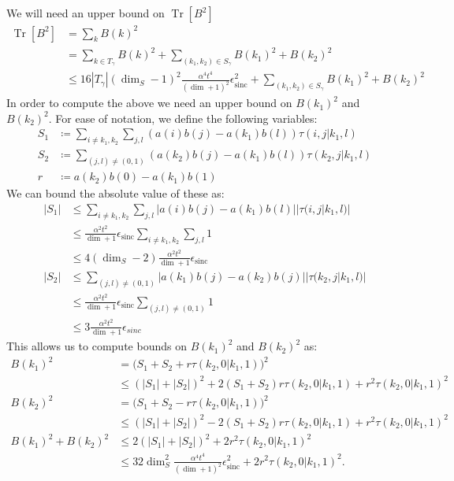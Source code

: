 \documentclass{article}
\newcommand{\brackets}[1]{\left[ #1 \right]}
\newcommand{\abs}[1]{\left| #1 \right|}
\DeclareMathOperator{\Tr}{Tr}
\newcommand{\trace}[1]{\Tr \brackets{ #1 }}
\DeclareMathOperator{\sinc}{sinc}
\begin{document}
We will need an upper bound on $\trace{B^2}$
\begin{align}
    \trace{B^2} &= \sum_k B(k)^2 \\
    &= \sum_{k \in T_{\gamma}} B(k)^2 + \sum_{(k_1, k_2) \in S_{\gamma}} B(k_1)^2 + B(k_2)^2 \\
    &\leq 16 |T_{\gamma}| (\dim_S - 1)^2 \frac{\alpha^4 t^4}{(\dim + 1)^2}\epsilon_{\sinc}^2 + \sum_{(k_1, k_2) \in S_{\gamma}} B(k_1)^2 + B(k_2)^2
\end{align}
In order to compute the above we need an upper bound on $B(k_1)^2$ and $B(k_2)^2$. For ease of notation, we define the following variables:
\begin{align}
    S_1 &\coloneqq \sum_{i \neq k_1, k_2} \sum_{j,l} (a(i) b(j) - a(k_1) b(l)) \tau(i, j|k_1, l) \\
    S_2 &\coloneqq \sum_{(j,l) \neq (0, 1)} (a(k_2) b(j) - a(k_1) b(l)) \tau(k_2, j| k_1, l) \\
    r &\coloneqq a(k_2) b(0) - a(k_1) b(1) 
\end{align}
We can bound the absolute value of these as:
\begin{align}
    \abs{S_1} &\leq \sum_{i \neq k_1, k_2} \sum_{j,l} |a(i) b(j) - a(k_1) b(l)| |\tau(i, j|k_1, l)| \\
    &\leq \frac{\alpha^2 t^2}{\dim + 1} \epsilon_{\sinc} \sum_{i \neq k_1, k_2} \sum_{j,l} 1\\
    &\leq 4 (\dim_S - 2) \frac{\alpha^2 t^2}{\dim + 1} \epsilon_{\sinc} \\
    \abs{S_2} &\leq \sum_{(j,l) \neq (0,1)} |a(k_1) b(j) - a(k_2) b(j)| |\tau(k_2, j | k_1, l)| \\
    &\leq \frac{\alpha^2 t^2}{\dim + 1} \epsilon_{\sinc} \sum_{(j,l) \neq (0,1)} 1 \\
    &\leq 3 \frac{\alpha^2 t^2}{\dim + 1} \epsilon_{sinc}
\end{align}
This allows us to compute bounds on $B(k_1)^2$ and $B(k_2)^2$ as:
\begin{align}
    B(k_1)^2 &= \bigg( S_1 + S_2 + r \tau(k_2, 0| k_1, 1) \bigg)^2 \\
    &\leq (|S_1| + |S_2|)^2 + 2(S_1 + S_2) r \tau(k_2, 0| k_1, 1) + r^2 \tau(k_2, 0| k_1, 1)^2 \\
    B(k_2)^2 &= \bigg( S_1 + S_2 - r \tau(k_2, 0 | k_1, 1) \bigg)^2 \\
    &\leq (|S_1| + |S_2|)^2 - 2 (S_1 + S_2) r \tau(k_2, 0 | k_1, 1) + r^2 \tau(k_2, 0 | k_1, 1)^2 \\
    B(k_1)^2 + B(k_2)^2 &\leq 2 (|S_1| + |S_2|)^2 + 2 r^2 \tau(k_2, 0 | k_1, 1)^2 \\
    &\leq 32 \dim_S^2 \frac{\alpha^4 t^4}{(\dim + 1)^2} \epsilon_{\sinc}^2 + 2 r^2 \tau(k_2, 0 | k_1, 1)^2.
\end{align}
\end{document}
